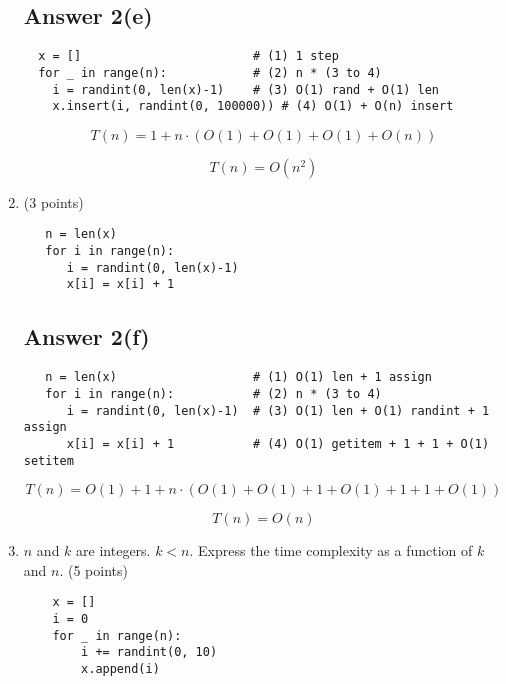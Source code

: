 \documentclass{article}
\begin{document}
\begin{enumerate}[label=(\alph*)]
\subsection*{Answer 2(e)}
    
\begin{verbatim}
  x = []                        # (1) 1 step
  for _ in range(n):            # (2) n * (3 to 4)
    i = randint(0, len(x)-1)    # (3) O(1) rand + O(1) len
    x.insert(i, randint(0, 100000)) # (4) O(1) + O(n) insert
\end{verbatim}

\begin{equation*}
  T(n) = 1 + n \cdot (O(1) + O(1) + O(1) + O(n)) 
\end{equation*}

\begin{equation*}
  \boxed{T(n) = O(n^2)}
\end{equation*}


\item (3 points)
\begin{verbatim}
   n = len(x)
   for i in range(n):
      i = randint(0, len(x)-1)
      x[i] = x[i] + 1
\end{verbatim}

\subsection*{Answer 2(f)}

\begin{verbatim}
   n = len(x)                   # (1) O(1) len + 1 assign
   for i in range(n):           # (2) n * (3 to 4)
      i = randint(0, len(x)-1)  # (3) O(1) len + O(1) randint + 1 assign
      x[i] = x[i] + 1           # (4) O(1) getitem + 1 + 1 + O(1) setitem
\end{verbatim}

\begin{equation*}
  T(n) = O(1) + 1 + n \cdot (O(1) + O(1) + 1 + O(1) + 1 + 1 + O(1))
\end{equation*}

\begin{equation*}
  \boxed{T(n) = O(n)}
\end{equation*}


\item $n$ and $k$ are integers.  $k < n$.  Express the time complexity as
  a function of $k$ and $n$. (5 points)
  
\begin{verbatim}
    x = []
    i = 0
    for _ in range(n):
        i += randint(0, 10)
        x.append(i)


\end{verbatim}
\end{enumerate}
\end{document}
